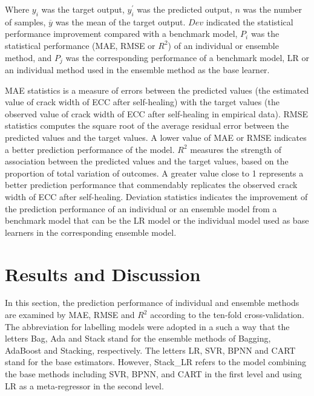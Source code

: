 \documentclass[11pt]{article}
\begin{document}
	Where $y_i$ was the target output, $y_i^{'}$ was the predicted output, $n$ was the number of samples, $\overline{y}$ was the mean of the target output. $Dev$ indicated the statistical performance improvement compared with a benchmark model, $P_i$ was the statistical performance (MAE, RMSE or  $R^2$) of an individual or ensemble method, and $P_j$ was the corresponding performance of a benchmark model, LR or an individual method used in the ensemble method as the base learner.
	
	MAE statistics is a measure of errors between the predicted values (the estimated value of crack width of ECC after self-healing) with the target  values (the observed value of crack width of ECC after self-healing in empirical data). RMSE statistics computes the square root of the average residual error between the predicted values and the target values. A lower value of MAE or RMSE indicates a better prediction performance of the model. $R^2$ measures the strength of association between the predicted values and the target values, based on the proportion of total variation of outcomes. A greater value close to 1 represents a better prediction performance that commendably replicates the observed crack width of ECC after self-healing.  Deviation statistics indicates the improvement of the prediction performance of an individual or an ensemble model from a benchmark model that can be the LR model or the individual model used as base learners in the corresponding ensemble model. 
	
	
	
	
	\section{Results and Discussion}
	\label{result}

	In this section, the prediction performance of individual and ensemble methods are examined by MAE, RMSE and $R^2$ according to the ten-fold cross-validation. The abbreviation for labelling models were adopted in a such a way that the letters Bag, Ada and Stack stand for the ensemble methods of Bagging, AdaBoost and Stacking, respectively. The letters LR, SVR, BPNN and CART stand for the base estimators. However,  Stack\_LR refers to the model combining the base methods including SVR, BPNN, and CART in the first level and using LR as a meta-regressor in the second level.
	
\end{document}
